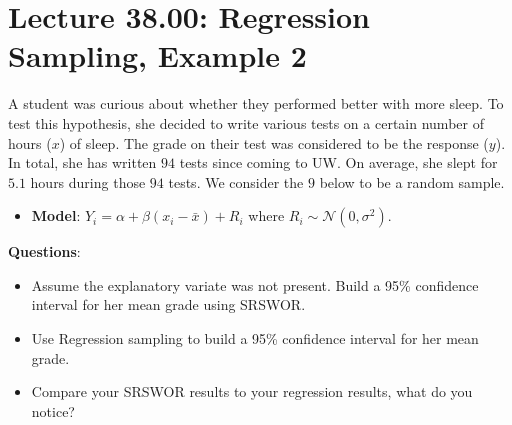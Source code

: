 \documentclass[oneside]{book}\usepackage[]{graphicx}\usepackage[dvipsnames,table,xcdraw]{xcolor}
\begin{document}
\section{Lecture 38.00: Regression Sampling, Example 2}
A student was curious about whether they performed better with
more sleep. To test this hypothesis, she decided to write
various tests on a certain number of hours ($x$) of sleep.
The grade on their test was considered to be the response ($y$).
In total, she has written $94$ tests since coming to UW.
On average, she slept for $5.1$ hours during those $94$
tests. We consider the $9$ below to be a random sample.
\begin{itemize}
    \item \textbf{Model}: $Y_i=\alpha+\beta(x_i-\bar{x})+R_i$ where $R_i \sim \mathcal{N}(0,\sigma^2)$.
\end{itemize}
\textbf{Questions}:
\begin{itemize}
    \item Assume the explanatory variate was not present. Build a 95\% confidence
          interval for her mean grade using SRSWOR.
    \item Use Regression sampling to build a 95\% confidence interval for her mean grade.
    \item Compare your SRSWOR results to your regression results, what do you notice?
\end{itemize}
\end{document}
